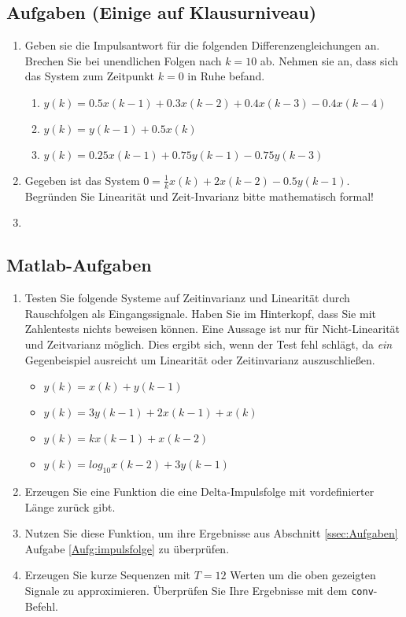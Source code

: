 \subsection{Aufgaben (Einige auf Klausurniveau)\label{ssec:Aufgaben}}
\begin{enumerate}
    \item \label{Aufg:impulsfolge}Geben sie die Impulsantwort für die folgenden
    Differenzengleichungen an. Brechen
    Sie bei unendlichen Folgen nach $k=10$ ab. Nehmen sie an, dass sich das System zum Zeitpunkt $k=0$
    in Ruhe befand.
    \begin{enumerate}
        \item $y(k) = 0.5x(k-1)+ 0.3x(k-2)+ 0.4x(k-3) - 0.4 x(k-4)$
        \item $y(k) = y(k-1)+0.5x(k)$
        \item $y(k) = 0.25 x(k-1)+0.75 y(k-1) - 0.75y(k-3)$
    \end{enumerate}
    \item Gegeben ist das System $0 = \frac{1}{k} x(k) + 2x(k-2) - 0.5y(k-1)$. Begründen Sie
    Linearität und Zeit-Invarianz bitte mathematisch formal!

    \item
\end{enumerate}

{
\subsection{Matlab-Aufgaben}
\begin{enumerate}
    \item Testen Sie folgende Systeme auf Zeitinvarianz und Linearität durch Rauschfolgen als
    Eingangssignale. Haben Sie im Hinterkopf, dass Sie mit Zahlentests nichts beweisen können.
    Eine Aussage ist nur für Nicht-Linearität und Zeitvarianz möglich. Dies ergibt sich, wenn
    der Test fehl schlägt, da {\em ein} Gegenbeispiel ausreicht um Linearität oder Zeitinvarianz
    auszuschließen.
    \begin{itemize}
        \item $y(k) = x(k) + y(k-1)$
        \item $y(k) = 3 y(k-1) + 2 x(k-1) + x(k)$
        \item $y(k) = k x(k-1) + x(k-2)$
        \item $y(k) = log_{10} x(k-2) + 3 y(k-1) $
    \end{itemize}
    \item Erzeugen Sie eine Funktion die eine Delta-Impulsfolge mit vordefinierter Länge zurück gibt.
    \item Nutzen Sie diese Funktion, um ihre Ergebnisse aus Abschnitt \ref{ssec:Aufgaben} Aufgabe \ref{Aufg:impulsfolge} zu überprüfen.
    \item Erzeugen Sie kurze Sequenzen mit $T = 12$ Werten um die oben gezeigten Signale zu approximieren.
    Überprüfen Sie Ihre Ergebnisse mit dem {\tt conv}-Befehl.
\end{enumerate}
}
